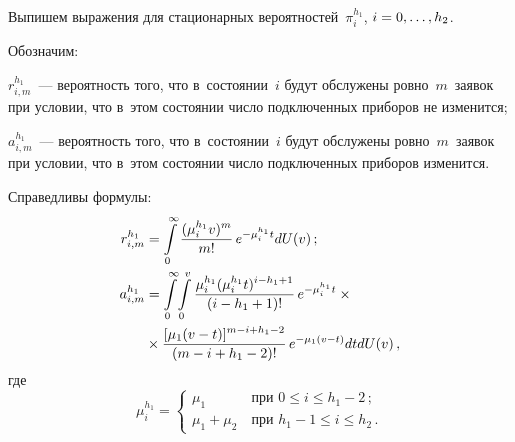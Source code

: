 \begin{multicols}{2}
  Выпишем выражения для стационарных вероятностей~$\pi_i^{h_1}$, $i\hm= 
0,\ldots , h_2$.
   
  Обозначим: 
\begin{description}
\item
  $r^{h_1}_{i,m}$~--- вероятность того, что в~состоянии~$i$ будут обслужены 
ровно~$m$~заявок при условии, что в~этом состоянии чис\-ло подключенных 
приборов не изменится; 
\item $a^{h_1}_{i,m}$~--- ве\-ро\-ят\-ность того, что 
в~состоянии~$i$ будут обслужены ров\-но~$m$~заявок при условии, что 
в~этом состоянии чис\-ло подключенных приборов изменится.
\end{description}
  
  Справедливы формулы:
  \begin{align*}
  r^{h_1}_{i,m} &= \int\limits_0^\infty \displaystyle\frac{\displaystyle (\mu_i^{h_1} v)^m\mathstrut}{\displaystyle m!\mathstrut}\,e^{-\mu_i^{h_1}t}dU(v)\,;\\
  a^{h_1}_{i,m} &= \int\limits_0^\infty\! \int\limits_0^v 
\displaystyle\frac{\displaystyle \mu_i^{h_1}(\mu_i^{h_1} t)^{i-h_1+1}\mathstrut}{\displaystyle (i-h_1+1)!\mathstrut}\,e^{-\mu_i^{h_1}t}\times{}\\
&{}\times  
\displaystyle\frac{\displaystyle [\mu_1(v-t)]^{m-i+h_1-2}\mathstrut}{\displaystyle (m-i+h_1-2)!\mathstrut}\,e^{-\mu_1(v-t)}dtdU(v)\,,
\end{align*}
где
$$
  \mu_i^{h_1} = \begin{cases}
  \mu_1 &\ \mbox{при } 0\leq i\leq h_1-2\,;\\
  \mu_1+\mu_2 &\ \mbox{при } h_1-1\leq i\leq h_2\,.
  \end{cases}
 $$
  
  


\pagebreak


\end{multicols}
